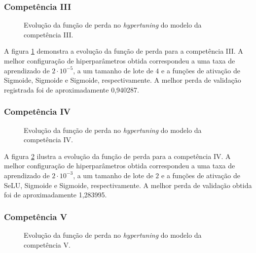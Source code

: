 \subsubsection{Competência III}
\label{subsec:exp-hyp-c3}

\begin{figure}[H]
    \resizebox{0.5\textwidth}{!}{}
    \caption{Evolução da função de perda no \textit{hypertuning} do modelo da competência III.}
    \label{fig:exp-hyp-c3}
\end{figure}

A figura \ref{fig:exp-hyp-c3} demonstra a evolução da função de perda para a competência III. A melhor configuração de hiperparâmetros obtida correspondeu a uma taxa de aprendizado de $2 \cdot 10^{-5}$, a um tamanho de lote de $4$ e a funções de ativação de Sigmoide, Sigmoide e Sigmoide, respectivamente. A melhor perda de validação registrada foi de aproximadamente 0,940287.

\subsubsection{Competência IV}
\label{subsec:exp-hyp-c4}

\begin{figure}[H]
    \resizebox{0.5\textwidth}{!}{}
    \caption{Evolução da função de perda no \textit{hypertuning} do modelo da competência IV.}
    \label{fig:exp-hyp-c4}
\end{figure}

A figura \ref{fig:exp-hyp-c4} ilustra a evolução da função de perda para a competência IV. A melhor configuração de hiperparâmetros obtida correspondeu a uma taxa de aprendizado de $2 \cdot 10^{-3}$, a um tamanho de lote de $2$ e a funções de ativação de SeLU, Sigmoide e Sigmoide, respectivamente. A melhor perda de validação obtida foi de aproximadamente 1,283995.

\subsubsection{Competência V}
\label{subsec:exp-hyp-c5}

\begin{figure}[H]
    \resizebox{0.5\textwidth}{!}{}
    \caption{Evolução da função de perda no \textit{hypertuning} do modelo da competência V.}
    \label{fig:exp-hyp-c5}
\end{figure}

